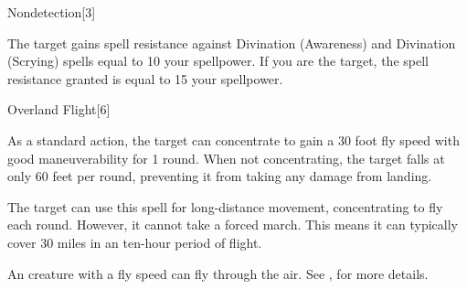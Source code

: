 \begin{spellsection}{Nondetection}[3]
    \begin{spellheader}
    \end{spellheader}
    \begin{spellcontent}
        \begin{spelltargetinginfo}
        \end{spelltargetinginfo}
        \begin{spelleffects}

            \spelleffect The target gains spell resistance against Divination (Awareness) and Divination (Scrying) spells equal to 10 \add your spellpower. If you are the target, the spell resistance granted is equal to 15 \add your spellpower.
            \spelldur \durext \dismissable
        \end{spelleffects}
    \end{spellcontent}
    \begin{spellfooter}
    \end{spellfooter}
\end{spellsection}

\begin{spellsection}{Overland Flight}[6]
    \begin{spellheader}
    \end{spellheader}
    \begin{spellcontent}
        \begin{spelltargetinginfo}
        \end{spelltargetinginfo}
        \begin{spelleffects}

            \spelleffect As a standard action, the target can concentrate to gain a 30 foot fly speed with good maneuverability for 1 round. When not concentrating, the target falls at only 60 feet per round, preventing it from taking any damage from landing.

            The target can use this spell for long-distance movement, concentrating to fly each round. However, it cannot take a forced march. This means it can typically cover 30 miles in an ten-hour period of flight.
            \spelldur \durext
        \end{spelleffects}
    \end{spellcontent}
    \begin{spellfooter}
        \spellnotes An \unencumbered creature with a fly speed can fly through the air. See , for more details.
    \end{spellfooter}
\end{spellsection}

